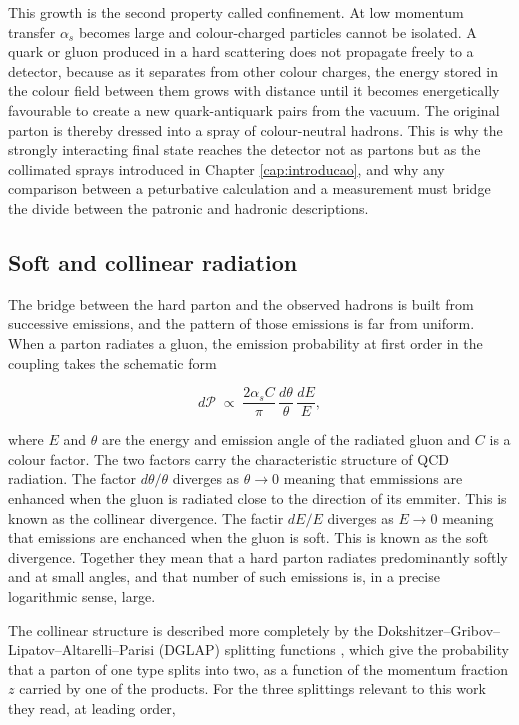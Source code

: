 This growth is the second property called confinement. At low momentum transfer
$\alpha_s$ becomes large and colour-charged particles cannot be isolated. A
quark or gluon produced in a hard scattering does not propagate freely to a detector,
because as it separates from other colour charges, the energy stored in the colour field
between them grows with distance until it becomes energetically favourable to create
a new quark-antiquark pairs from the vacuum. The original parton is thereby
dressed into a spray of colour-neutral hadrons. This is why the strongly interacting
final state reaches the detector not as partons but as the collimated sprays introduced
in Chapter \ref{cap:introducao}, and why any comparison between a peturbative
calculation and a measurement must bridge the divide between the patronic and hadronic
descriptions.

\subsection{Soft and collinear radiation}

The bridge between the hard parton and the observed hadrons is built from
successive emissions, and the pattern of those emissions is far from uniform.
When a parton radiates a gluon, the emission probability at first order in the
coupling takes the schematic form

\begin{equation}
  d\mathcal{P} \;\propto\; \frac{2\alpha_s C}{\pi}\,
  \frac{d\theta}{\theta}\,\frac{dE}{E},
  \label{eq:soft-collinear}
\end{equation}

where $E$ and $\theta$ are the energy and emission angle of the radiated gluon
and $C$ is a colour factor. The two factors carry the characteristic structure of
QCD radiation. The factor $d\theta/\theta$ diverges as $\theta \to 0$ meaning that
emmissions are enhanced when the gluon is radiated close to the direction of its emmiter.
This is known as the collinear divergence. The factir $dE/E$ diverges as $E \to 0$
meaning that emissions are enchanced when the gluon is soft. This is known
as the soft divergence. Together they mean that a hard parton radiates predominantly
softly and at small angles, and that number of such emissions is,
in a precise logarithmic sense, large.

The collinear structure is described more completely by the 
Dokshitzer–Gribov–Lipatov–Altarelli–Parisi (DGLAP) splitting
functions \cite{Ellis:1996mzs}, which give the probability that a parton of one type splits into two,
as a function of the momentum fraction $z$ carried by one of the products. For
the three splittings relevant to this work they read, at leading order,

